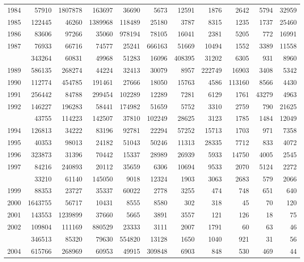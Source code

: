\documentclass[
]{article}
\begin{document}
\begin{longtable}[t]{lrrrrrrrrrr}
1984 & 57910 & 1807878 & 163697 & 36690 & 5673 & 12591 & 1876 & 2642 & 5794 & 32959\\
1985 & 122445 & 46260 & 1389968 & 118489 & 25180 & 3787 & 8315 & 1235 & 1737 & 25460\\
1986 & 83606 & 97266 & 35060 & 978194 & 78105 & 16041 & 2381 & 5205 & 772 & 16991\\
1987 & 76933 & 66716 & 74577 & 25241 & 666163 & 51669 & 10494 & 1552 & 3389 & 11558\\
\addlinespace
1988 & 343264 & 60831 & 49968 & 51283 & 16096 & 408395 & 31202 & 6305 & 931 & 8960\\
1989 & 586135 & 268274 & 44224 & 32413 & 30079 & 8957 & 222749 & 16903 & 3408 & 5342\\
1990 & 112774 & 454785 & 191461 & 27666 & 18050 & 15763 & 4586 & 113160 & 8566 & 4430\\
1991 & 256442 & 84788 & 299454 & 102289 & 12289 & 7281 & 6129 & 1761 & 43279 & 4963\\
1992 & 146227 & 196283 & 58441 & 174982 & 51659 & 5752 & 3310 & 2759 & 790 & 21625\\
\addlinespace
1993 & 43755 & 114223 & 142507 & 37810 & 102249 & 28625 & 3123 & 1785 & 1484 & 12049\\
1994 & 126813 & 34222 & 83196 & 92781 & 22294 & 57252 & 15713 & 1703 & 971 & 7358\\
1995 & 40353 & 98013 & 24182 & 51043 & 50246 & 11313 & 28335 & 7712 & 833 & 4072\\
1996 & 323873 & 31396 & 70442 & 15337 & 28989 & 26939 & 5933 & 14750 & 4005 & 2545\\
1997 & 84216 & 240893 & 20112 & 35659 & 6306 & 10694 & 9533 & 2070 & 5124 & 2272\\
\addlinespace
1998 & 33210 & 61140 & 145050 & 9018 & 12324 & 1903 & 3063 & 2683 & 579 & 2066\\
1999 & 88353 & 23727 & 35337 & 60022 & 2778 & 3255 & 474 & 748 & 651 & 640\\
2000 & 1643755 & 56717 & 10431 & 8555 & 8580 & 302 & 318 & 45 & 70 & 120\\
2001 & 143553 & 1239899 & 37660 & 5665 & 3891 & 3557 & 121 & 126 & 18 & 75\\
2002 & 109804 & 111169 & 880529 & 23333 & 3111 & 2007 & 1791 & 60 & 63 & 46\\
\addlinespace
2003 & 346513 & 85320 & 79630 & 554820 & 13128 & 1650 & 1040 & 921 & 31 & 56\\
2004 & 615766 & 268969 & 60953 & 49915 & 309848 & 6903 & 848 & 530 & 469 & 44\\

\end{longtable}
\end{document}
